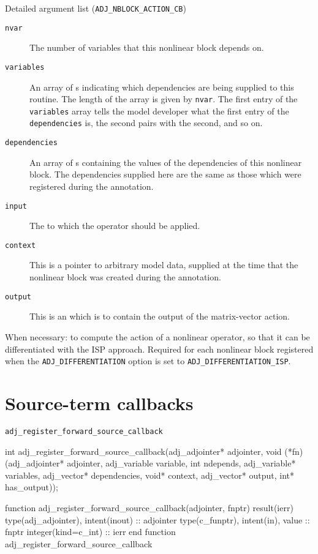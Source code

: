 \begin{boxwithtitle}{Detailed argument list (\texttt{ADJ_NBLOCK_ACTION_CB})}
\begin{description}
\item[\texttt{nvar}] The number of variables that this nonlinear block depends on.
\item[\texttt{variables}] An array of s indicating which dependencies are being supplied to this routine. The length of the
array is given by \texttt{nvar}. The first entry of the \texttt{variables} array
tells the model developer what the first entry of the \texttt{dependencies} is, the second pairs with the second, and so on.
\item[\texttt{dependencies}] An array of s containing the values of the dependencies of this nonlinear block. The dependencies supplied
here are the same as those which were registered during the annotation.
\item[\texttt{input}] The  to which the operator should be applied.
\item[\texttt{context}] This is a pointer to arbitrary model data, supplied at the time that the nonlinear block was created during the annotation.
\item[\texttt{output}] This is an  which is to contain the output of the matrix-vector action.
\end{description}
\end{boxwithtitle}

When necessary: 
to compute the action of a nonlinear operator, so that it can be differentiated
with the ISP approach.
Required for each nonlinear block registered when the \texttt{ADJ_DIFFERENTIATION} option is set to \texttt{ADJ_DIFFERENTIATION_ISP}.


\section{Source-term callbacks}
\begin{boxwithtitle}{\texttt{adj_register_forward_source_callback}}
\begin{minipage}{\columnwidth}
\begin{ccode}
int adj_register_forward_source_callback(adj_adjointer* adjointer, 
                 void (*fn)(adj_adjointer* adjointer, adj_variable variable, 
                            int ndepends, adj_variable* variables, 
                            adj_vector* dependencies, void* context, 
                            adj_vector* output, int* has_output));
\end{ccode}
\begin{fortrancode}
function adj_register_forward_source_callback(adjointer, fnptr) 
                                                   result(ierr) 
  type(adj_adjointer), intent(inout) :: adjointer
  type(c_funptr), intent(in), value :: fnptr
  integer(kind=c_int) :: ierr
end function adj_register_forward_source_callback
\end{fortrancode}
\end{minipage}
\end{boxwithtitle}

